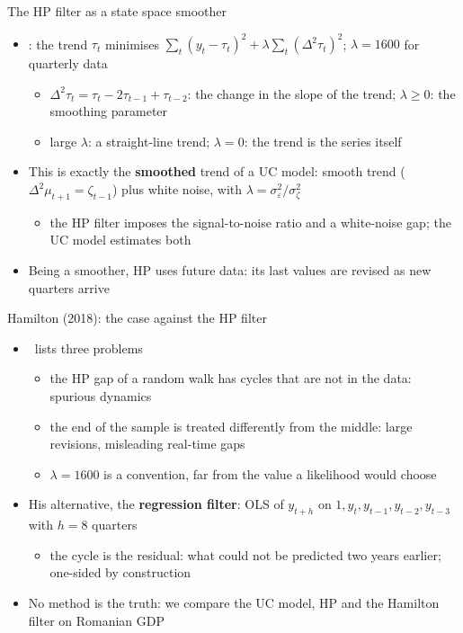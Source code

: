 \begin{frame}{The HP filter as a state space smoother}
\itemsize{\small}
\begin{itemize}
    \item {}: the trend $\tau_t$ minimises $\sum_t(y_t - \tau_t)^2 + \lambda\sum_t(\Delta^2\tau_t)^2$; $\lambda = 1600$ for quarterly data
    \begin{itemize}
        \item $\Delta^2\tau_t = \tau_t - 2\tau_{t-1} + \tau_{t-2}$: the change in the slope of the trend; $\lambda \ge 0$: the smoothing parameter
        \item large $\lambda$: a straight-line trend; $\lambda = 0$: the trend is the series itself
    \end{itemize}
    \item This is exactly the \textbf{smoothed} trend of a UC model: smooth trend ($\Delta^2\mu_{t+1} = \zeta_{t-1}$) plus white noise, with $\lambda = \sigma^2_\varepsilon/\sigma^2_\zeta$ 
    \begin{itemize}
        \item the HP filter imposes the signal-to-noise ratio and a white-noise gap; the UC model estimates both
    \end{itemize}
    \item Being a smoother, HP uses future data: its last values are revised as new quarters arrive
\end{itemize}
\end{frame}

\begin{frame}{Hamilton (2018): the case against the HP filter}
\itemsize{\small}
\begin{itemize}
    \item {}\ lists three problems
    \begin{itemize}
        \item the HP gap of a random walk has cycles that are not in the data: spurious dynamics
        \item the end of the sample is treated differently from the middle: large revisions, misleading real-time gaps
        \item $\lambda = 1600$ is a convention, far from the value a likelihood would choose
    \end{itemize}
    \item His alternative, the \textbf{regression filter}: OLS of $y_{t+h}$ on $1, y_t, y_{t-1}, y_{t-2}, y_{t-3}$ with $h = 8$ quarters
    \begin{itemize}
        \item the cycle is the residual: what could not be predicted two years earlier; one-sided by construction
    \end{itemize}
    \item No method is the truth: we compare the UC model, HP and the Hamilton filter on Romanian GDP
\end{itemize}
\end{frame}

